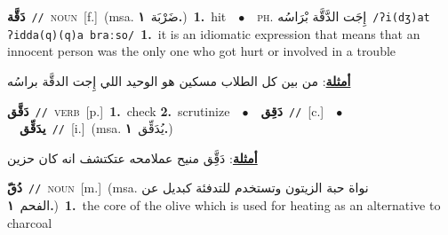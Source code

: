 \documentclass[10pt,a4paper,twoside]{article} %
\begin{document}
\begin{multicols}{2}
{\setlength\topsep{0pt}\textbf{\foreignlanguage{arabic}{دَقَّة}}\ {\color{gray}\texttt{//}\color{black}}\ \textsc{noun}\ [f.]\ \color{gray}(msa. \foreignlanguage{arabic}{ضَرْبَة}~\foreignlanguage{arabic}{\textbf{١.}})\color{black}\ \textbf{1.}~hit\ \ $\bullet$\ \ \textsc{ph.} \color{gray} \foreignlanguage{arabic}{إِجَت الدَّقَّة بْرَاسُه}\color{black}\ {\color{gray}\texttt{/{\sffamily ʔi(dʒ)at ʔidda(q)(q)a braːso}/}\color{black}}\ \textbf{1.}~it is an idiomatic expression that means that an innocent person was the only one who got hurt or involved in a trouble\  \begin{flushright}\color{gray}\foreignlanguage{arabic}{\textbf{\underline{\foreignlanguage{arabic}{أمثلة}}}: من بين كل الطلاب مسكين هو الوحيد اللي إِجت الدقَّة براسُه}\end{flushright}\color{black}} \vspace{2mm}

{\setlength\topsep{0pt}\textbf{\foreignlanguage{arabic}{دَقَّق}}\ {\color{gray}\texttt{//}\color{black}}\ \textsc{verb}\ [p.]\ \textbf{1.}~check  \textbf{2.}~scrutinize\ \ $\bullet$\ \ \setlength\topsep{0pt}\textbf{\foreignlanguage{arabic}{دَقِق}}\ {\color{gray}\texttt{//}\color{black}}\ [c.]\ \ $\bullet$\ \ \setlength\topsep{0pt}\textbf{\foreignlanguage{arabic}{يدَقِّق}}\ {\color{gray}\texttt{//}\color{black}}\ [i.]\ \color{gray}(msa. \foreignlanguage{arabic}{يُدَقِّق}~\foreignlanguage{arabic}{\textbf{١.}})\color{black}\  \begin{flushright}\color{gray}\foreignlanguage{arabic}{\textbf{\underline{\foreignlanguage{arabic}{أمثلة}}}: دَقَِّق منيح عملامحه عتكتشف انه كان حزين}\end{flushright}\color{black}} \vspace{2mm}

{\setlength\topsep{0pt}\textbf{\foreignlanguage{arabic}{دُقّ}}\ {\color{gray}\texttt{//}\color{black}}\ \textsc{noun}\ [m.]\ \color{gray}(msa. \foreignlanguage{arabic}{نواة حبة الزيتون وتستخدم للتدفئة كبديل عن الفحم}~\foreignlanguage{arabic}{\textbf{١.}})\color{black}\ \textbf{1.}~the core of the olive which is used for heating as an alternative to charcoal\ } \vspace{2mm}


\end{multicols}
\end{document}
